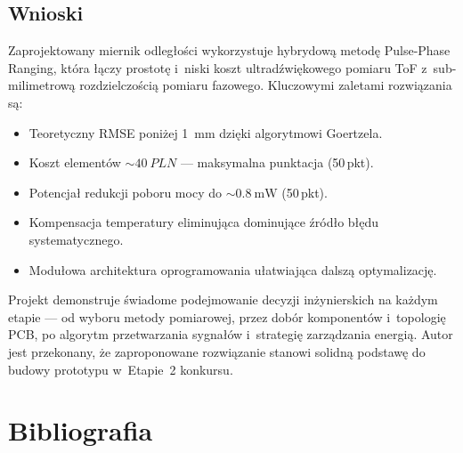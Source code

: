 \documentclass[a4paper,11pt]{article}
\begin{document}
\subsection{Wnioski}

Zaprojektowany miernik odległości wykorzystuje hybrydową metodę Pulse-Phase
Ranging, która łączy prostotę i~niski koszt ultradźwiękowego pomiaru ToF
z~sub-milimetrową rozdzielczością pomiaru fazowego. Kluczowymi zaletami
rozwiązania są:

\begin{itemize}[nosep]
    \item Teoretyczny RMSE poniżej \SI{1}{\milli\metre} dzięki algorytmowi Goertzela.
    \item Koszt elementów ${\sim}\SI{40}{PLN}$ --- maksymalna punktacja (50\,pkt).
    \item Potencjał redukcji poboru mocy do ${\sim}\SI{0,8}{\milli\watt}$ (50\,pkt).
    \item Kompensacja temperatury eliminująca dominujące źródło błędu systematycznego.
    \item Modułowa architektura oprogramowania ułatwiająca dalszą optymalizację.
\end{itemize}

Projekt demonstruje świadome podejmowanie decyzji inżynierskich na każdym
etapie --- od wyboru metody pomiarowej, przez dobór komponentów i~topologię
PCB, po algorytm przetwarzania sygnałów i~strategię zarządzania energią.
Autor jest przekonany, że zaproponowane rozwiązanie stanowi solidną podstawę
do budowy prototypu w~Etapie~2 konkursu.


\section*{Bibliografia}
\end{document}
